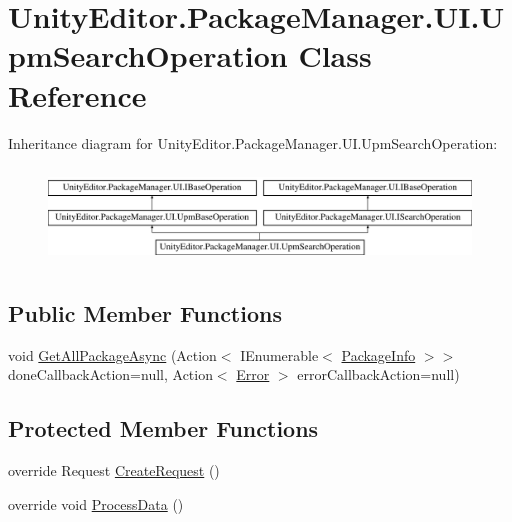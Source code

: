 \hypertarget{class_unity_editor_1_1_package_manager_1_1_u_i_1_1_upm_search_operation}{}\section{Unity\+Editor.\+Package\+Manager.\+U\+I.\+Upm\+Search\+Operation Class Reference}
\label{class_unity_editor_1_1_package_manager_1_1_u_i_1_1_upm_search_operation}
Inheritance diagram for Unity\+Editor.\+Package\+Manager.\+U\+I.\+Upm\+Search\+Operation\+:\begin{figure}[H]
\begin{center}
\leavevmode
\includegraphics[height=2.584615cm]{class_unity_editor_1_1_package_manager_1_1_u_i_1_1_upm_search_operation}
\end{center}
\end{figure}
\subsection*{Public Member Functions}
\begin{DoxyCompactItemize}
\item 
void \mbox{\hyperlink{class_unity_editor_1_1_package_manager_1_1_u_i_1_1_upm_search_operation_a91ffb1376e5ee22e1e845960dad16437}{Get\+All\+Package\+Async}} (Action$<$ I\+Enumerable$<$ \mbox{\hyperlink{class_unity_editor_1_1_package_manager_1_1_u_i_1_1_package_info}{Package\+Info}} $>$$>$ done\+Callback\+Action=null, Action$<$ \mbox{\hyperlink{class_unity_editor_1_1_package_manager_1_1_u_i_1_1_upm_base_operation_a116dcc466d587905084e826b47f7e05b}{Error}} $>$ error\+Callback\+Action=null)
\end{DoxyCompactItemize}
\subsection*{Protected Member Functions}
\begin{DoxyCompactItemize}
\item 
override Request \mbox{\hyperlink{class_unity_editor_1_1_package_manager_1_1_u_i_1_1_upm_search_operation_ac66ee3f7eb67d73713ed31c1560c50a2}{Create\+Request}} ()
\item 
override void \mbox{\hyperlink{class_unity_editor_1_1_package_manager_1_1_u_i_1_1_upm_search_operation_a1a7f1b1ca0ed96bcee79db2246cc3a4c}{Process\+Data}} ()
\end{DoxyCompactItemize}
